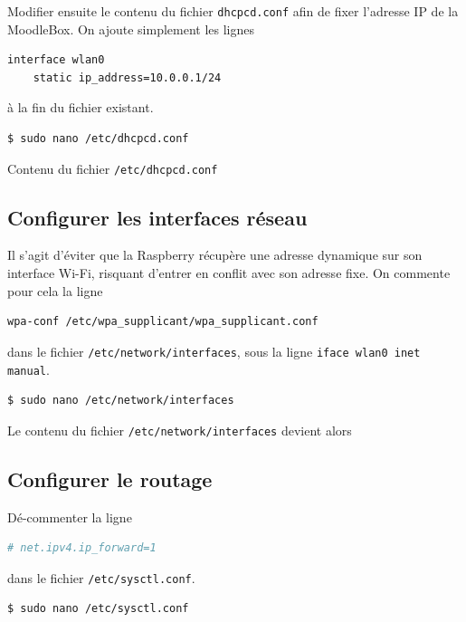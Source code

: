 \documentclass[11pt]{article}
\begin{document}
Modifier ensuite le contenu du fichier \lstinline{dhcpcd.conf} afin de fixer l'adresse IP de la MoodleBox. On ajoute simplement les lignes
\begin{lstlisting}[language=bash]
interface wlan0
    static ip_address=10.0.0.1/24
\end{lstlisting}
à la fin du fichier existant.

\begin{lstlisting}[language=bash]
$ sudo nano /etc/dhcpcd.conf
\end{lstlisting}

Contenu du fichier \lstinline{/etc/dhcpcd.conf}




\subsection{Configurer les interfaces réseau}

Il s'agit d'éviter que la Raspberry récupère une adresse dynamique sur son interface Wi-Fi, risquant d'entrer en conflit avec son adresse fixe. On commente pour cela la ligne
\begin{lstlisting}[language=bash]
wpa-conf /etc/wpa_supplicant/wpa_supplicant.conf
\end{lstlisting}
dans le fichier \lstinline{/etc/network/interfaces}, sous la ligne \lstinline{iface wlan0 inet manual}.

\begin{lstlisting}[language=bash]
$ sudo nano /etc/network/interfaces
\end{lstlisting}

Le contenu du fichier \lstinline{/etc/network/interfaces} devient alors



\subsection{Configurer le routage}

Dé-commenter la ligne 
\begin{lstlisting}[language=bash]
# net.ipv4.ip_forward=1
\end{lstlisting}
dans le fichier \lstinline{/etc/sysctl.conf}.

\begin{lstlisting}[language=bash]
$ sudo nano /etc/sysctl.conf
\end{lstlisting}
\end{document}
